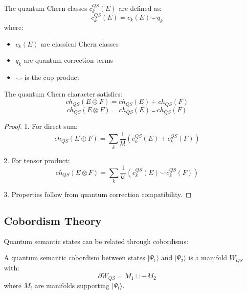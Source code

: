\documentclass[12pt]{article}
\begin{document}
\begin{definition}
The quantum Chern classes $c_k^{QS}(E)$ are defined as:
\begin{equation}
c_k^{QS}(E) = c_k(E) \smile q_k
\end{equation}
where:
\begin{itemize}
\item $c_k(E)$ are classical Chern classes
\item $q_k$ are quantum correction terms
\item $\smile$ is the cup product
\end{itemize}
\end{definition}

\begin{theorem}
The quantum Chern character satisfies:
\begin{equation}
ch_{QS}(E \oplus F) = ch_{QS}(E) + ch_{QS}(F)
\end{equation}
\begin{equation}
ch_{QS}(E \otimes F) = ch_{QS}(E) \smile ch_{QS}(F)
\end{equation}
\end{theorem}

\begin{proof}
1. For direct sum:
\begin{equation}
ch_{QS}(E \oplus F) = \sum_k \frac{1}{k!}(c_k^{QS}(E) + c_k^{QS}(F))
\end{equation}

2. For tensor product:
\begin{equation}
ch_{QS}(E \otimes F) = \sum_k \frac{1}{k!}(c_k^{QS}(E) \smile c_k^{QS}(F))
\end{equation}

3. Properties follow from quantum correction compatibility.
\end{proof}

\subsection{Cobordism Theory}

Quantum semantic states can be related through cobordisms:

\begin{definition}
A quantum semantic cobordism between states $|Ψ_1⟩$ and $|Ψ_2⟩$ is a manifold $W_{QS}$ with:
\begin{equation}
∂W_{QS} = M_1 \sqcup -M_2
\end{equation}
where $M_i$ are manifolds supporting $|Ψ_i⟩$.
\end{definition}
\end{document}

